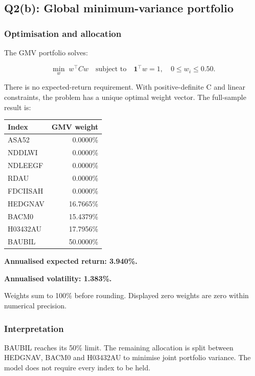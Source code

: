 \documentclass[
  10pt,
  a4paper,
]{article}
\begin{document}
\newpage

\hypertarget{q2b-global-minimum-variance-portfolio}{%
\subsection{Q2(b): Global minimum-variance
portfolio}\label{q2b-global-minimum-variance-portfolio}}

\hypertarget{optimisation-and-allocation}{%
\subsubsection{Optimisation and
allocation}\label{optimisation-and-allocation}}

The GMV portfolio solves:

\[
\min_w\;w^\top Cw
\quad\text{subject to}\quad
\mathbf1^\top w=1,\quad0\leq w_i\leq0.50.
\]

There is no expected-return requirement. With positive-definite C and
linear constraints, the problem has a unique optimal weight vector. The
full-sample result is:

\begin{longtable}[]{@{}lr@{}}
\toprule\noalign{}
Index & GMV weight \\
\midrule\noalign{}
\endhead
\bottomrule\noalign{}
\endlastfoot
ASA52 & 0.0000\% \\
NDDLWI & 0.0000\% \\
NDLEEGF & 0.0000\% \\
RDAU & 0.0000\% \\
FDCIISAH & 0.0000\% \\
HEDGNAV & 16.7665\% \\
BACM0 & 15.4379\% \\
H03432AU & 17.7956\% \\
BAUBIL & 50.0000\% \\
\end{longtable}

\textbf{Annualised expected return: 3.940\%.}

\textbf{Annualised volatility: 1.383\%.}

Weights sum to 100\% before rounding. Displayed zero weights are zero
within numerical precision.

\hypertarget{interpretation}{%
\subsubsection{Interpretation}\label{interpretation}}

BAUBIL reaches its 50\% limit. The remaining allocation is split between
HEDGNAV, BACM0 and H03432AU to minimise joint portfolio variance. The
model does not require every index to be held.
\end{document}
